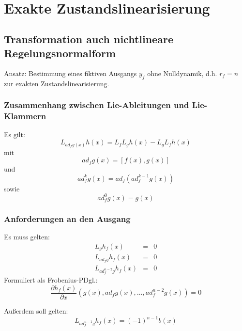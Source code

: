 \chapter{Exakte Zustandslinearisierung}
\section{Transformation auch nichtlineare Regelungsnormalform}
Ansatz: Bestimmung eines fiktiven Ausgangs $y_f$ ohne Nulldynamik, d.h. $r_f = n$ zur
exakten Zustandslinearisierung.

\subsection{Zusammenhang zwischen Lie-Ableitungen und Lie-Klammern}
Es gilt:
\begin{equation}
    L_{ad_f g(x)} h(x) = L_f L_g h(x) - L_g L_f h(x)
\end{equation}
mit
\begin{equation}
    ad_f g(x) = [f(x), g(x)]
\end{equation}
und
\begin{equation}
    ad_f^k g(x) = ad_f (ad_f^{k-1} g(x))
\end{equation}
sowie
\begin{equation}
    ad_f^0 g(x) = g(x)
\end{equation}

\subsection{Anforderungen an den Ausgang}
Es muss gelten:
\begin{eqnarray}
    L_g h_f(x) &=& 0 \\
    L_{ad_f g} h_f(x) &=& 0 \\
    L_{ad_f^{n-2} g} h_f(x) &=& 0
\end{eqnarray}
Formuliert als Frobenius-PDgl.:
\begin{equation}
    \frac{\partial h_f(x)}{\partial x} \left(g(x), ad_f g(x), \ldots, ad_f^{n-2} g(x)\right) = 0
\end{equation}

Außerdem soll gelten:
\begin{equation}
    L_{ad_f^{n-1} g} h_f(x) = {(-1)}^{n-1} b(x)
\end{equation}

